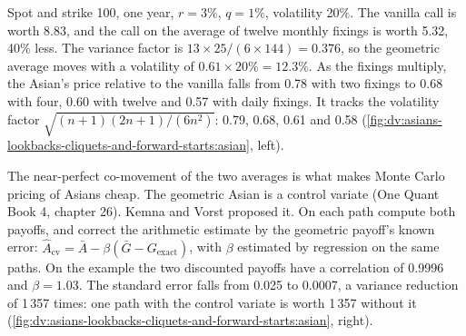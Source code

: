 \begin{example}\label{ex:dv:asians-lookbacks-cliquets-and-forward-starts:asian}
Spot and strike 100, one year, $r=3\%$, $q=1\%$, volatility 20\%. The vanilla call is worth 8.83, and the call on the
average of twelve monthly fixings is worth 5.32, 40\% less. The variance factor is $13\times25/(6\times144)=0.376$, so the
geometric average moves with a volatility of $0.61\times20\%=12.3\%$. As the fixings multiply, the Asian's price relative
to the vanilla falls from 0.78 with two fixings to 0.68 with four, 0.60 with twelve and 0.57 with daily fixings. It tracks
the volatility factor $\sqrt{(n+1)(2n+1)/(6n^2)}$: 0.79, 0.68, 0.61 and 0.58
(\cref{fig:dv:asians-lookbacks-cliquets-and-forward-starts:asian}, left).
\end{example}

The near-perfect co-movement of the two averages is what makes Monte Carlo pricing of Asians cheap. The geometric Asian
is a control variate (One Quant Book 4, chapter 26). Kemna and Vorst proposed it. On each path compute both payoffs, and
correct the arithmetic estimate by the geometric payoff's known error:
$\hat A_{\mathrm{cv}}=\bar A-\beta(\bar G-G_{\mathrm{exact}})$, with $\beta$ estimated by regression on the same
paths. On the example the two discounted payoffs have a correlation of 0.9996 and $\beta=1.03$. The standard error falls
from 0.025 to 0.0007, a variance reduction of 1\,357 times: one path with the control variate is worth 1\,357 without
it (\cref{fig:dv:asians-lookbacks-cliquets-and-forward-starts:asian}, right).

